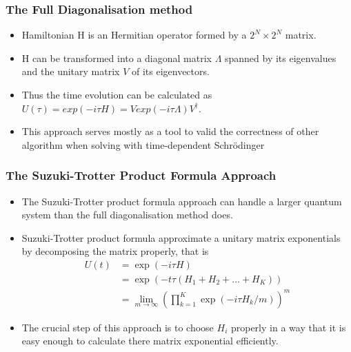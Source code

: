 \documentclass{beamer}
\begin{document}
\begin{frame}
	\frametitle{The Full Diagonalisation method}
	\begin{itemize}
		\item Hamiltonian H is an Hermitian operator formed by a $2^N \times 2^N$ matrix.
		\item H can be transformed into a diagonal matrix $\Lambda$ spanned by its eigenvalues and the unitary matrix $V$ of its eigenvectors.
		\item Thus the time evolution can be calculated as $U(\tau) = exp(-i\tau H) = V exp(-i\tau \Lambda) V^\dagger$.
		\item This approach serves mostly as a tool to valid the correctness of other algorithm when solving with time-dependent Schrödinger
	\end{itemize}
%	
\end{frame}

\begin{frame}
	\frametitle{The Suzuki-Trotter Product Formula Approach}
	\begin{itemize}
		\item The Suzuki-Trotter product formula approach can handle a larger quantum system than the full diagonalisation method does.
		\item Suzuki-Trotter product formula approximate a unitary matrix exponentials by decomposing the matrix properly, that is 
		\begin{equation*}
		\label{suzuki-trotter product formula}
		\begin{split}
		U(t) &= \exp(-i\tau H)\\
		&=\exp(-t\tau(H_1+H_2+\dots+H_K))\\
		&=\lim_{m \to \infty}(\prod_{k=1}^{K}\exp(-i\tau H_k/m))^m
		\end{split}
		\end{equation*}
		\item  The crucial step of this approach is to choose $H_i$ properly in a way that it is easy enough to calculate there matrix exponential efficiently.
	\end{itemize}
\end{frame}
\end{document}
